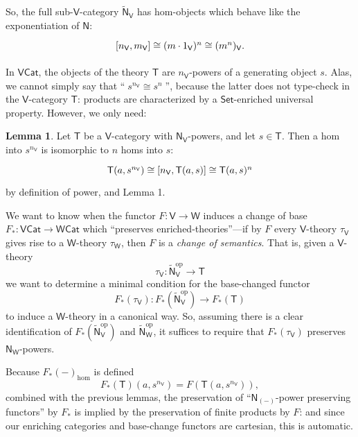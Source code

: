 \documentclass{amsart}
\theoremstyle{definition}
\newtheorem{lemma}[theorem]{Lemma}
\newcommand{\Set}{\mathsf{Set}}
\newcommand{\Cat}{\mathsf{Cat}}
\newcommand{\NN}{\mathsf{N}}
\newcommand{\V}{\mathsf{V}}
\newcommand{\W}{\mathsf{W}}
\newcommand{\T}{\mathsf{T}}
\newcommand{\op}{\mathrm{op}}
\newcommand{\maps}{\colon}
\begin{document}
So, the full sub-$\V$-category $\tilde{\NN}_\V$ has hom-objects which behave like the exponentiation of $\NN$:
\[\begin{tikzcd}
\left[n_\V,m_\V\right] \cong (m\cdot 1_\V)^n \cong (m^n)_\V.
\end{tikzcd}\]

In $\V\Cat$, the objects of the theory $\T$ are $n_\V$-powers of a generating object $s$. Alas, we cannot simply say that ``$\;s^{n_\V} \cong s^n\;$'', because the latter does not type-check in the $\V$-category $\T$: products are characterized by a $\Set$-enriched universal property. However, we only need:

\begin{lemma}
	Let $\T$ be a $\V$-category with $\NN_\V$-powers, and let $s \in \T$. Then a hom into $s^{n_\V}$ is isomorphic to $n$ homs into $s$: 
\[\begin{tikzcd} \T(a,s^{n_\V}) \cong [n_\V,\T(a,s)] \cong \T(a,s)^n \end{tikzcd}\] 
by definition of power, and Lemma 1.
\end{lemma}

We want to know when the functor $F\maps\V \to \W$ induces a change of base $F_*\maps\V\Cat \to \W\Cat$ which ``preserves enriched-theories''---if by $F$ every $\V$-theory $\tau_\V$ gives rise to a $\W$-theory $\tau_\W$, then $F$ is a \textit{change of semantics}. That is, given a $\V$-theory $$\tau_\V\maps \tilde{\NN}_\V^\op \to \T$$ we want to determine a minimal condition for the base-changed functor $$F_*(\tau_\V)\maps F_*(\tilde{\NN}_\V^\op) \to F_*(\T)$$ to induce a $\W$-theory in a canonical way. So, assuming there is a clear identification of $F_*(\tilde{\NN}_\V^\op)$ and $\tilde{\NN}_\W^\op$, it suffices to require that $F_*(\tau_\V)$ preserves $\NN_\W$-powers.

Because $F_*(-)_{\text{hom}}$ is defined $$F_*(\T)(a,s^{n_\V}) = F(\T(a,s^{n_\V})),$$ combined with the previous lemmas, the preservation of ``$\NN_{(-)}$-power preserving functors'' by $F_*$ is implied by the preservation of finite products by $F$: and since our enriching categories and base-change functors are cartesian, this is automatic.
\end{document}
